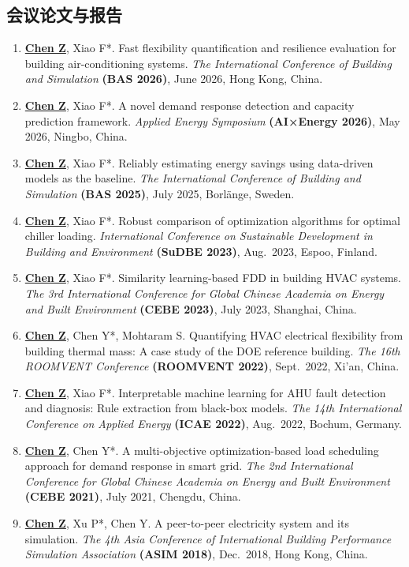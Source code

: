 \documentclass[11pt,a4paper]{article}
\newcounter{cvbookmark}
\newcommand{\cvoutline}[2]{%
  \stepcounter{cvbookmark}%
  \pdfbookmark[#1]{#2}{cvbookmark.\thecvbookmark}%
}
\newcommand{\cvsubsection}[2]{%
  \cvoutline{2}{#1}%
  \subsection*{#2}%
}
\newcommand{\me}[1]{\underline{\textbf{#1}}}
\begin{document}
\cvsubsection{会议论文与报告}{\color{darkblue}会议论文与报告}
\begin{enumerate}
\item \me{Chen Z}, Xiao F*. Fast flexibility quantification and resilience evaluation for building air-conditioning systems. \textit{The International Conference of Building and Simulation} \textbf{(BAS 2026)}, June 2026, Hong Kong, China.
\item \me{Chen Z}, Xiao F*. A novel demand response detection and capacity prediction framework. \textit{Applied Energy Symposium} \textbf{(AI×Energy 2026)}, May 2026, Ningbo, China.
\item \me{Chen Z}, Xiao F*. Reliably estimating energy savings using data-driven models as the baseline. \textit{The International Conference of Building and Simulation} \textbf{(BAS 2025)}, July 2025, Borlänge, Sweden.
\item \me{Chen Z}, Xiao F*. Robust comparison of optimization algorithms for optimal chiller loading. \textit{International Conference on Sustainable Development in Building and Environment} \textbf{(SuDBE 2023)}, Aug.\ 2023, Espoo, Finland.
\item \me{Chen Z}, Xiao F*. Similarity learning-based FDD in building HVAC systems. \textit{The 3rd International Conference for Global Chinese Academia on Energy and Built Environment} \textbf{(CEBE 2023)}, July 2023, Shanghai, China.
\item \me{Chen Z}, Chen Y*, Mohtaram S. Quantifying HVAC electrical flexibility from building thermal mass: A case study of the DOE reference building. \textit{The 16th ROOMVENT Conference} \textbf{(ROOMVENT 2022)}, Sept.\ 2022, Xi'an, China.
\item \me{Chen Z}, Xiao F*. Interpretable machine learning for AHU fault detection and diagnosis: Rule extraction from black-box models. \textit{The 14th International Conference on Applied Energy} \textbf{(ICAE 2022)}, Aug.\ 2022, Bochum, Germany.
\item \me{Chen Z}, Chen Y*. A multi-objective optimization-based load scheduling approach for demand response in smart grid. \textit{The 2nd International Conference for Global Chinese Academia on Energy and Built Environment} \textbf{(CEBE 2021)}, July 2021, Chengdu, China.
\item \me{Chen Z}, Xu P*, Chen Y. A peer-to-peer electricity system and its simulation. \textit{The 4th Asia Conference of International Building Performance Simulation Association} \textbf{(ASIM 2018)}, Dec.\ 2018, Hong Kong, China.
\end{enumerate}
\end{document}
